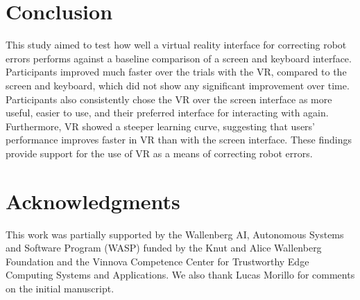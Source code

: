 \documentclass[letterpaper, 10 pt, conference]{ieeeconf}  %
\begin{document}
\section{Conclusion}
This study aimed to test how well a virtual reality interface for correcting robot errors performs against a baseline comparison of a screen and keyboard interface. Participants improved much faster over the trials with the VR, compared to the screen and keyboard, which did not show any significant improvement over time. Participants also consistently chose the VR over the screen interface as more useful, easier to use, and their preferred interface for interacting with again. Furthermore, VR showed a steeper learning curve, suggesting that users' performance improves faster in VR than with the screen interface.  These findings provide support for the use of VR as a means of correcting robot errors. 



% 
\section{Acknowledgments}
This work was partially supported by the Wallenberg AI, Autonomous Systems and Software Program (WASP) funded by the Knut and Alice Wallenberg Foundation and the Vinnova Competence Center for Trustworthy Edge Computing Systems and Applications. We also thank Lucas Morillo for comments on the initial manuscript.



\end{document}
